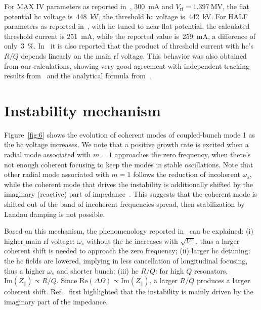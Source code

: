 \documentclass[a4paper,
               ]{jacow}
\begin{document}
For MAX IV parameters as reported in~\cite{Cullinan2024}, \SI{300}{\milli\ampere} and $V_\mathrm{rf} = \SI{1.397}{\mega\volt}$, the flat potential \gls{hc} voltage is~\SI{448}{\kilo\volt}, the threshold \gls{hc} voltage is~\SI{442}{\kilo\volt}. For HALF parameters as reported in~\cite{He2022a}, with \gls{hc} tuned to near flat potential, the calculated threshold current is \SI{251}{\milli\ampere}, while the reported value is~\SI{259}{\milli\ampere}, a difference of only~\SI{3}{\percent}. In~\cite{He2022a} it is also reported that the product of threshold current with \gls{hc}'s~$R/Q$ depends linearly on the main rf voltage. This behavior was also obtained from our calculations, showing very good agreement with independent tracking results from~\cite{He2022a} and the analytical formula from~\cite{He2022b}.

\section{Instability mechanism}
Figure~\ref{fig:6} shows the evolution of coherent modes of coupled-bunch mode 1 as the \gls{hc} voltage increases. We note that a positive growth rate is excited when a radial mode associated with $m=1$ approaches the zero frequency, when there's not enough coherent focusing to keep the modes in stable oscillations. Note that other radial mode associated with $m=1$ follows the reduction of incoherent $\omega_s$, while the coherent mode that drives the instability is additionally shifted by the imaginary (reactive) part of impedance~\cite{Alves:HarmonLIP24}. This suggests that the coherent mode is shifted out of the band of incoherent frequencies spread, then stabilization by Landau damping is not possible.

Based on this mechanism, the phenomenology reported in~\cite{He2022a, Cullinan2024} can be explained: (i) higher main rf voltage: $\omega_s$ without the \gls{hc} increases with $\sqrt{V_\mathrm{rf}}$, thus a larger coherent shift is needed to approach the zero frequency; (ii) larger \gls{hc} detuning: the \gls{hc} fields are lowered, implying in less cancellation of longitudinal focusing, thus a higher $\omega_s$ and shorter bunch; (iii) \gls{hc} $R/Q$: for high $Q$ resonators, $\mathrm{Im}(Z_\parallel) \propto R/Q$. Since $\mathrm{Re}(\Delta \Omega) \propto \mathrm{Im}(Z_\parallel)$, a larger $R/Q$ produces a larger coherent shift. Ref.~\cite{Venturini2018} first highlighted that the instability is mainly driven by the imaginary part of the impedance.
\end{document}
